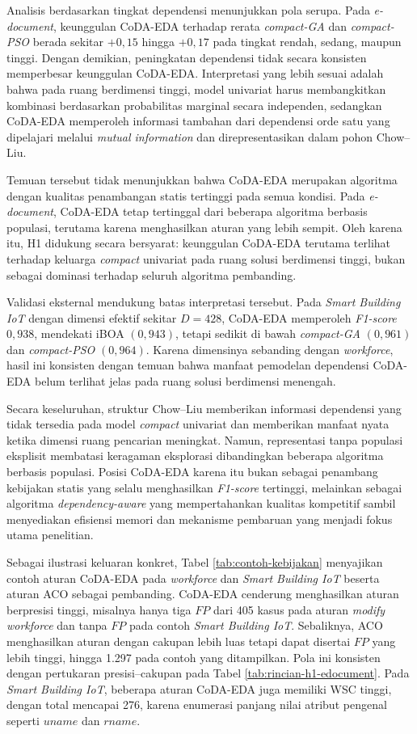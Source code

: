 Analisis berdasarkan tingkat dependensi menunjukkan pola serupa. 
Pada \textit{e-document}, keunggulan CoDA-EDA terhadap rerata \textit{compact-GA} dan \textit{compact-PSO} berada sekitar $+0,15$ hingga $+0,17$ pada tingkat rendah, sedang, maupun tinggi. 
Dengan demikian, peningkatan dependensi tidak secara konsisten memperbesar keunggulan CoDA-EDA. 
Interpretasi yang lebih sesuai adalah bahwa pada ruang berdimensi tinggi, model univariat harus membangkitkan kombinasi berdasarkan probabilitas marginal secara independen, sedangkan CoDA-EDA memperoleh informasi tambahan dari dependensi orde satu yang dipelajari melalui \textit{mutual information} dan direpresentasikan dalam pohon Chow–Liu.

Temuan tersebut tidak menunjukkan bahwa CoDA-EDA merupakan algoritma dengan kualitas penambangan statis tertinggi pada semua kondisi. 
Pada \textit{e-document}, CoDA-EDA tetap tertinggal dari beberapa algoritma berbasis populasi, terutama karena menghasilkan aturan yang lebih sempit. 
Oleh karena itu, H1 didukung secara bersyarat: keunggulan CoDA-EDA terutama terlihat terhadap keluarga \textit{compact} univariat pada ruang solusi berdimensi tinggi, bukan sebagai dominasi terhadap seluruh algoritma pembanding.

Validasi eksternal mendukung batas interpretasi tersebut. 
Pada \textit{Smart Building IoT} dengan dimensi efektif sekitar $D=428$, CoDA-EDA memperoleh \textit{F1-score} $0,938$, mendekati iBOA $(0,943)$, tetapi sedikit di bawah \textit{compact-GA} $(0,961)$ dan \textit{compact-PSO} $(0,964)$. 
Karena dimensinya sebanding dengan \textit{workforce}, hasil ini konsisten dengan temuan bahwa manfaat pemodelan dependensi CoDA-EDA belum terlihat jelas pada ruang solusi berdimensi menengah.

Secara keseluruhan, struktur Chow–Liu memberikan informasi dependensi yang tidak tersedia pada model \textit{compact} univariat dan memberikan manfaat nyata ketika dimensi ruang pencarian meningkat. 
Namun, representasi tanpa populasi eksplisit membatasi keragaman eksplorasi dibandingkan beberapa algoritma berbasis populasi. 
Posisi CoDA-EDA karena itu bukan sebagai penambang kebijakan statis yang selalu menghasilkan \textit{F1-score} tertinggi, melainkan sebagai algoritma \textit{dependency-aware} yang mempertahankan kualitas kompetitif sambil menyediakan efisiensi memori dan mekanisme pembaruan yang menjadi fokus utama penelitian.

Sebagai ilustrasi keluaran konkret, Tabel \ref{tab:contoh-kebijakan} menyajikan contoh aturan CoDA-EDA pada \textit{workforce} dan \textit{Smart Building IoT} beserta aturan ACO sebagai pembanding. 
CoDA-EDA cenderung menghasilkan aturan berpresisi tinggi, misalnya hanya tiga $FP$ dari 405 kasus pada aturan \textit{modify workforce} dan tanpa $FP$ pada contoh \textit{Smart Building IoT}. 
Sebaliknya, ACO menghasilkan aturan dengan cakupan lebih luas tetapi dapat disertai $FP$ yang lebih tinggi, hingga 1.297 pada contoh yang ditampilkan. 
Pola ini konsisten dengan pertukaran presisi–cakupan pada Tabel \ref{tab:rincian-h1-edocument}. 
Pada \textit{Smart Building IoT}, beberapa aturan CoDA-EDA juga memiliki WSC tinggi, dengan total mencapai 276, karena enumerasi panjang nilai atribut pengenal seperti $uname$ dan $rname$.

